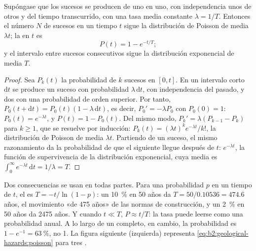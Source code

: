 \begin{proposition}\label{prop:b2:geological-hazards:poisson}
Supóngase que los sucesos se producen de uno en uno, con independencia unos de
otros y del tiempo transcurrido, con una tasa media constante $\lambda = 1/T$. Entonces el número $N$ de
sucesos en un tiempo $t$ sigue la distribución de Poisson de media $\lambda t$; la  en $t$ es
\begin{equation}
P(t) = 1 - e^{-t/T};
\label{eq:b2:geological-hazards:poisson}
\end{equation}
y el intervalo entre sucesos consecutivos sigue la distribución exponencial de media $T$.
\end{proposition}

\begin{proof}
Sea $P_k(t)$ la probabilidad de $k$ sucesos en $[0, t]$. En un intervalo corto $\mathrm{d}t$ se
produce un suceso con probabilidad $\lambda\,\mathrm{d}t$, con independencia del pasado, y dos con una
probabilidad de orden superior. Por tanto, $P_0(t + \mathrm{d}t) = P_0(t)(1 - \lambda\,\mathrm{d}t)$, es decir,
$P_0' = -\lambda P_0$ con $P_0(0) = 1$: $P_0(t) = e^{-\lambda t}$, y $P(t) = 1 - P_0(t)$. Del
mismo modo, $P_k' = \lambda(P_{k-1} - P_k)$ para $k \geq 1$, que se resuelve por inducción:
$P_k(t) = (\lambda t)^k e^{-\lambda t}/k!$, la distribución de Poisson de media $\lambda t$. Partiendo de
un suceso, el mismo razonamiento da la probabilidad de que el siguiente llegue después de $t$:
$e^{-\lambda t}$, la función de supervivencia de la distribución exponencial, cuya media es
$\int_0^\infty e^{-\lambda t}\,\mathrm{d}t = 1/\lambda = T$.
\end{proof}

Dos consecuencias se usan en todas partes. Para una probabilidad $p$ en un tiempo de  $t$, el  es $T = -t/\ln(1 - p)$: un \qty{10}{\percent} en 50 años da $T = 50/0.10536 =
474.6$ años, el movimiento «de 475 años» de las normas de construcción, y un \qty{2}{\percent} en 50 años
da 2475 años. Y cuando $t \ll T$, $P \approx t/T$: la tasa puede leerse como una
probabilidad anual. A lo largo de un  completo, en cambio, la probabilidad es $1 - e^{-1} =
\qty{63}{\percent}$, no 1. La figura siguiente (izquierda) representa \eqref{eq:b2:geological-hazards:poisson}
para tres .

